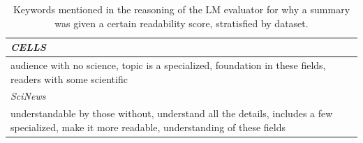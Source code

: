 \begin{table}[!h]
\begin{tabular}{p{}}
\vspace{-1mm}\textit{CELLS} \\ \hline
audience with no science, topic is a specialized, foundation in these fields, readers with some scientific
\\ 

\vspace{-1mm}\textit{SciNews}\\ \hline
understandable by those without, understand all the details, includes a few specialized, make it more readable, understanding of these fields \\ 
\end{tabular}
\caption{Keywords mentioned in the reasoning of the LM evaluator for why a summary was given a certain readability score, stratisfied by dataset.}
\label{tab:keywords_by_dataset}
\end{table}